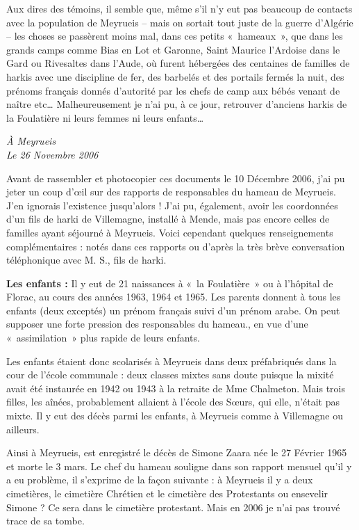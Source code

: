 
Aux dires des témoins, il semble que, même s’il n’y eut pas beaucoup de contacts
avec la population de Meyrueis -- mais on sortait tout juste de la guerre d’Algérie -- les
choses se passèrent moins mal, dans ces petits «~hameaux~», que dans les grands
camps comme Bias en Lot et Garonne, Saint Maurice l’Ardoise dans le Gard ou
Rivesaltes dans l’Aude, où furent hébergées des centaines de familles de harkis avec
une discipline de fer, des barbelés et des portails fermés la nuit, des prénoms français
donnés d’autorité par les chefs de camp aux bébés venant de naître etc…
Malheureusement je n’ai pu, à ce jour, retrouver d’anciens harkis de la Foulatière ni
leurs femmes ni leurs enfants…

\begin{flushright}
\textit{À Meyrueis\\
Le 26 Novembre 2006}
\end{flushright}

\newpage
{}

Avant de rassembler et photocopier ces documents le 10 Décembre 2006, j’ai pu jeter
un coup d’œil sur des rapports de responsables du hameau de Meyrueis. J’en ignorais
l’existence jusqu’alors ! J’ai pu, également, avoir les coordonnées d’un fils de harki
de Villemagne, installé à Mende, mais pas encore celles de familles ayant séjourné à
Meyrueis. Voici cependant quelques renseignements complémentaires : notés dans ces
rapports ou d’après la très brève conversation téléphonique avec M. S., fils de harki.

\textbf{Les enfants :} Il y eut de 21 naissances à «~la Foulatière~» ou à l’hôpital de Florac, au
cours des années 1963, 1964 et 1965. Les parents donnent à tous les enfants (deux
exceptés) un prénom français suivi d’un prénom arabe. On peut supposer une forte
pression des responsables du hameau., en vue d’une «~assimilation~» plus rapide de
leurs enfants.

Les enfants étaient donc scolarisés à Meyrueis dans deux préfabriqués dans la cour de
l’école communale : deux classes mixtes sans doute puisque la mixité avait été
instaurée en 1942 ou 1943 à la retraite de Mme Chalmeton.
Mais trois filles, les aînées, probablement allaient à l’école des Sœurs, qui elle, n’était
pas mixte.
Il y eut des décès parmi les enfants, à Meyrueis comme à Villemagne ou ailleurs.

Ainsi à Meyrueis, est enregistré le décès de Simone Zaara née le 27 Février 1965 et
morte le 3 mars. Le chef du hameau souligne dans son rapport mensuel qu’il y a eu
problème, il s’exprime de la façon suivante : à Meyrueis il y a deux cimetières, le
cimetière Chrétien et le cimetière des Protestants ou ensevelir Simone ?
Ce sera dans le cimetière protestant. Mais en 2006 je n’ai pas trouvé trace de sa
tombe.

